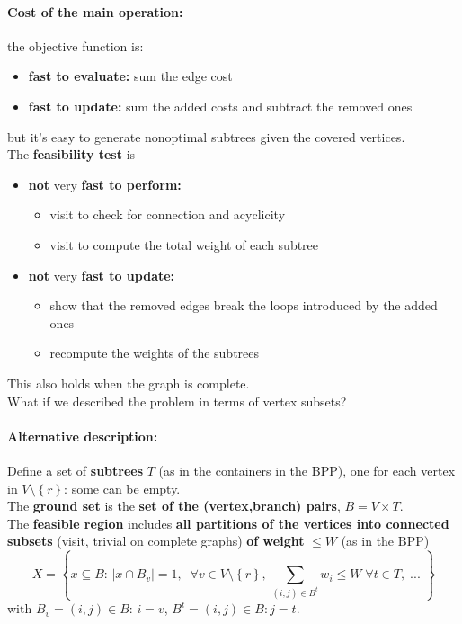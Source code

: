 \paragraph{Cost of the main operation:} the objective function is:
\begin{itemize}
	\item \textbf{fast to evaluate:} sum the edge cost
	\item \textbf{fast to update:} sum the added costs and subtract the removed ones
\end{itemize}
but it's easy to generate nonoptimal subtrees given the covered vertices.\\

The \textbf{feasibility test} is
\begin{itemize}
	\item \textbf{not} very \textbf{fast to perform:} 
	\begin{itemize}
		\item visit to check for connection and acyclicity
		\item visit to compute the total weight of each subtree
	\end{itemize}
	\item \textbf{not} very \textbf{fast to update:} 
	\begin{itemize}
		\item show that the removed edges break the loops introduced by the added ones
		\item recompute the weights of the subtrees
	\end{itemize}
\end{itemize}
This also holds when the graph is complete.\\

What if we described the problem in terms of vertex subsets?

\newpage

\paragraph{Alternative description:} Define a set of \textbf{subtrees} $T$ (as in the containers in the BPP), one for each vertex in $V \setminus \left\{r\right\}$: some can be empty.\\

The \textbf{ground set} is the \textbf{set of the (vertex,branch) pairs}, $B = V \times T$.\\

The \textbf{feasible region} includes \textbf{all partitions of the vertices into connected subsets} (visit, trivial on complete graphs) \textbf{of weight} $\leq W$ (as in the BPP)
$$ X = \left\{x \subseteq B : \, |x \cap B_v| = 1, \;\; \forall v \in V \setminus \left\{r\right\}, \, \sum_{(i,j)\in B^t} w_i \leq W \; \forall t \in T, \; ... \; \right\}$$
with $B_v = {(i, j) \in B : \, i = v }$, $B^t = {(i, j) \in B : j = t}$.\\

